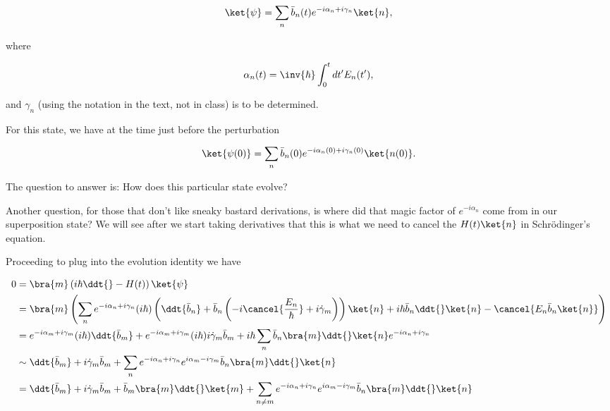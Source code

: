 \begin{equation}\label{eqn:adiabaticPertTakeII:70}
\ket{\psi} = \sum_n \bar{b}_n(t) e^{-i\alpha_n + i \gamma_n} \ket{n},
\end{equation}

where

\begin{equation}\label{eqn:adiabaticPertTakeII:90}
\alpha_n(t) = \inv{\hbar} \int_0^t dt' E_n(t'),
\end{equation}

and $\gamma_n$ (using the notation in the text, not in class) is to be determined.

For this state, we have at the time just before the perturbation

\begin{equation}\label{eqn:adiabaticPertTakeII:110}
\ket{\psi(0)} = \sum_n \bar{b}_n(0) e^{-i\alpha_n(0) + i \gamma_n(0)} \ket{n(0)}.
\end{equation}

The question to answer is: How does this particular state evolve?

Another question, for those that don't like sneaky bastard derivations, is where did that magic factor of $e^{-i\alpha_n}$ come from in our superposition state? We will see after we start taking derivatives that this is what we need to cancel the $H(t)\ket{n}$ in Schr\"{o}dinger's equation.

Proceeding to plug into the evolution identity we have

\begin{align*}
0 &=
\bra{m} \left( i \hbar \ddt{} - H(t) \right) \ket{\psi} \\
&=
\bra{m} \left(
\sum_n 
e^{-i \alpha_n + i \gamma_n}
(i \hbar) \left(
\ddt{\bar{b}_n}
+ \bar{b}_n \left(-i \cancel{\frac{E_n}{\hbar}} + i \dot{\gamma}_m \right)
\right) \ket{n}
+ i \hbar \bar{b}_n \ddt{} \ket{n}
- \cancel{E_n \bar{b}_n \ket{n}} 
\right)
\\
&=
e^{-i \alpha_m + i \gamma_m}
(i \hbar) 
\ddt{\bar{b}_m}
+
e^{-i \alpha_m + i \gamma_m}
(i \hbar) 
i \dot{\gamma}_m \bar{b}_m
+ i \hbar \sum_n \bar{b}_n \bra{m} \ddt{} \ket{n}
e^{-i \alpha_n + i \gamma_n} \\
&\sim
\ddt{\bar{b}_m}
+
i \dot{\gamma}_m \bar{b}_m
+ 
\sum_n 
e^{-i \alpha_n + i \gamma_n}
e^{i \alpha_m - i \gamma_m}
\bar{b}_n \bra{m} \ddt{} \ket{n} \\
&=
\ddt{\bar{b}_m}
+
i \dot{\gamma}_m \bar{b}_m
+ 
\bar{b}_m \bra{m} \ddt{} \ket{m}
+
\sum_{n \ne m} 
e^{-i \alpha_n + i \gamma_n}
e^{i \alpha_m - i \gamma_m}
\bar{b}_n \bra{m} \ddt{} \ket{n}
\end{align*}

